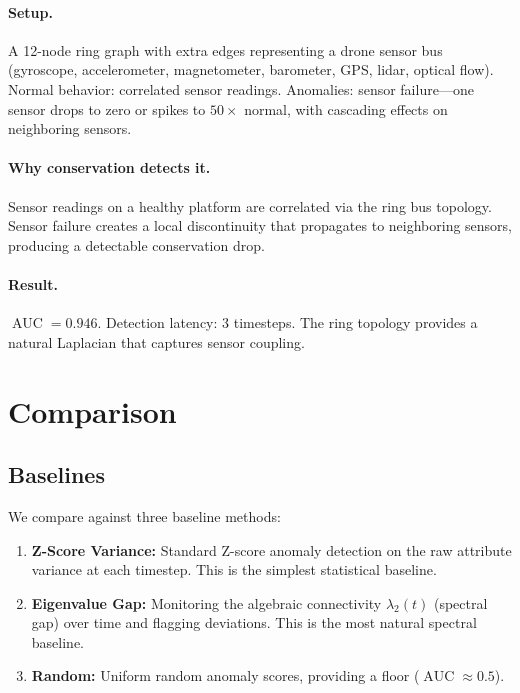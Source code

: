 \documentclass[11pt,a4paper]{article}
\DeclareMathOperator{\AUC}{AUC}
\begin{document}
\paragraph{Setup.} A 12-node ring graph with extra edges representing a drone
sensor bus (gyroscope, accelerometer, magnetometer, barometer, GPS, lidar, optical
flow).  Normal behavior: correlated sensor readings.  Anomalies: sensor
failure---one sensor drops to zero or spikes to $50\times$ normal, with cascading
effects on neighboring sensors.

\paragraph{Why conservation detects it.} Sensor readings on a healthy platform
are correlated via the ring bus topology.  Sensor failure creates a local
discontinuity that propagates to neighboring sensors, producing a detectable
conservation drop.

\paragraph{Result.} $\AUC = 0.946$.  Detection latency: 3 timesteps.  The ring
topology provides a natural Laplacian that captures sensor coupling.

\section{Comparison}\label{sec:comparison}

\subsection{Baselines}

We compare against three baseline methods:

\begin{enumerate}
  \item \textbf{Z-Score Variance:} Standard Z-score anomaly detection on the
        raw attribute variance at each timestep.  This is the simplest
        statistical baseline.
  \item \textbf{Eigenvalue Gap:} Monitoring the algebraic connectivity
        $\lambda_2(t)$ (spectral gap) over time and flagging deviations.
        This is the most natural spectral baseline.
  \item \textbf{Random:} Uniform random anomaly scores, providing a floor
        ($\AUC \approx 0.5$).
\end{enumerate}
\end{document}
